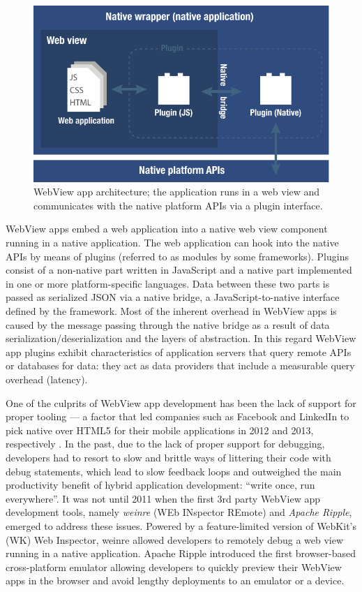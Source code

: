 \documentclass[thesis.tex]{subfiles}
\begin{document}
\begin{figure}[ht]
\centering \includegraphics[width=\textwidth]{images/web-view-app-structure}
\caption{WebView app architecture; the application runs in a web view and communicates with the native platform APIs via a plugin interface.\label{fig:web-view-app}}
\end{figure}

WebView apps embed a web application into a native web view component running in a native application. The web application can hook into the native APIs by means of plugins (referred to as modules by some frameworks). Plugins consist of a non-native part written in JavaScript and a native part implemented in one or more platform-specific languages. Data between these two parts is passed as serialized JSON via a native bridge, a JavaScript-to-native interface defined by the framework. Most of the inherent overhead in WebView apps is caused by the message passing through the native bridge as a result of data serialization/deserialization and the layers of abstraction. In this regard WebView app plugins exhibit characteristics of application servers that query remote APIs or databases for data: they act as data providers that include a measurable query overhead (latency).

One of the culprits of WebView app development has been the lack of support for proper tooling --- a factor that led companies such as Facebook and LinkedIn to pick native over HTML5 for their mobile applications in 2012 and 2013, respectively \cite{html_vs_native_facebook}\cite{html_vs_native_linkedin}. In the past, due to the lack of proper support for debugging, developers had to resort to slow and brittle ways of littering their code with debug statements, which lead to slow feedback loops and outweighed the main productivity benefit of hybrid application development: ``write once, run everywhere''. It was not until 2011 when the first 3rd party WebView app development tools, namely \textit{weinre} (WEb INspector REmote) and \textit{Apache Ripple}, emerged to address these issues. Powered by a feature-limited version of WebKit's (WK) Web Inspector, weinre allowed developers to remotely debug a web view running in a native application. Apache Ripple introduced the first browser-based cross-platform emulator allowing developers to quickly preview their WebView apps in the browser and avoid lengthy deployments to an emulator or a device.
\end{document}
